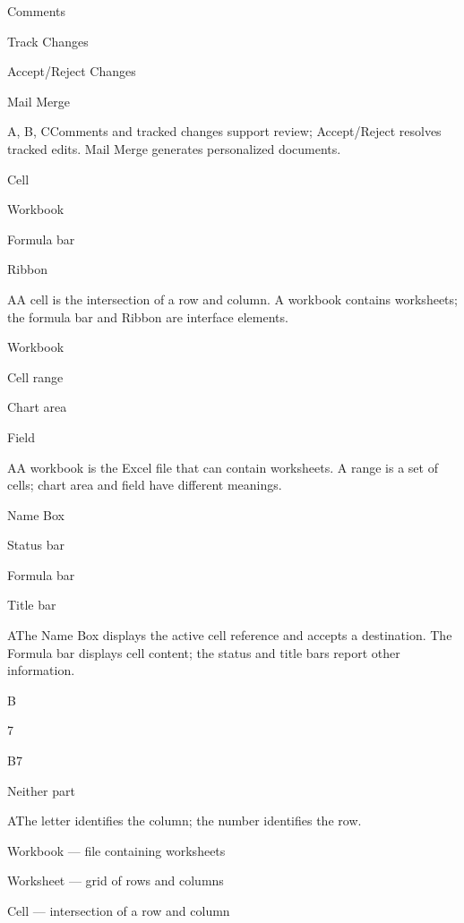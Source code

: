 \begin{enumerate}[label=\textbf{Q\arabic*.}, leftmargin=*]
  {\item Comments
   \item Track Changes
   \item Accept/Reject Changes
   \item Mail Merge}
  {A, B, C}{Comments and tracked changes support review; Accept/Reject resolves tracked edits. Mail Merge generates personalized documents.}
\fi
\ifnum{}
  {\item Cell
   \item Workbook
   \item Formula bar
   \item Ribbon}
  {A}{A cell is the intersection of a row and column. A workbook contains worksheets; the formula bar and Ribbon are interface elements.}
  {\item Workbook
   \item Cell range
   \item Chart area
   \item Field}
  {A}{A workbook is the Excel file that can contain worksheets. A range is a set of cells; chart area and field have different meanings.}
  {\item Name Box
   \item Status bar
   \item Formula bar
   \item Title bar}
  {A}{The Name Box displays the active cell reference and accepts a destination. The Formula bar displays cell content; the status and title bars report other information.}
  {\item B
   \item 7
   \item B7
   \item Neither part}
  {A}{The letter identifies the column; the number identifies the row.}
  {\item Workbook --- file containing worksheets
   \item Worksheet --- grid of rows and columns
   \item Cell --- intersection of a row and column
}
\end{enumerate}
